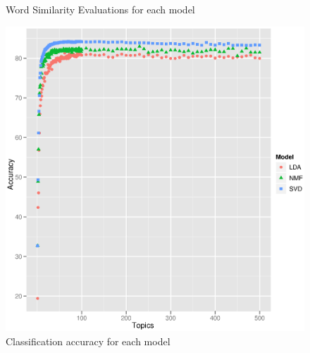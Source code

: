 \begin{figure}[h!t!b!]
  \centering
  \caption{Word Similarity Evaluations for each model}
  \label{fig:wordsim}
\end{figure}

\begin{figure}[h!t!b!]
  \centering
  \includegraphics[width=.50\textwidth,height=.35\textwidth]{plots/avatar_classifier.eps}
  \caption{Classification accuracy for each model}
  \label{fig:predict}
\end{figure}


